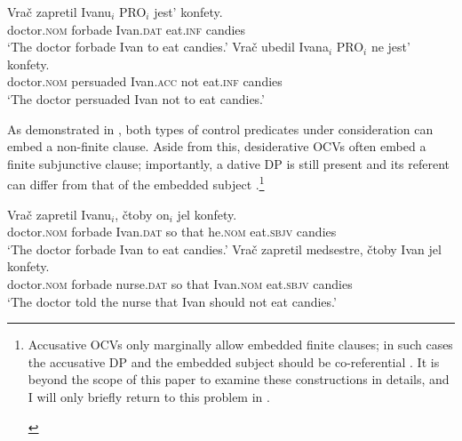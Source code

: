 \documentclass[output=paper,
colorlinks,
citecolor=brown,
newtxmath
]{langscibook}
\begin{document}
\begin{exe}
\ex\label{ex3} \begin{xlist}
\ex\label{ex3a} 
\gll Vrač zapretil Ivanu$_i$ PRO$_i$ jest’ konfety.\\ 
    doctor.\textsc{nom} forbade Ivan.\textsc{dat} {} eat.\textsc{inf} candies \\
\glt `The doctor forbade Ivan to eat candies.'
\ex\label{ex3b} 
\gll Vrač ubedil Ivana$_i$ PRO$_i$ ne jest’ konfety.\\ 
    doctor.\textsc{nom} persuaded Ivan.\textsc{acc} {} not eat.\textsc{inf} candies \\
\glt `The doctor persuaded Ivan not to eat candies.'
    \end{xlist}
\end{exe}

\noindent As demonstrated in , both types of control predicates under consideration can embed a non-finite clause. Aside from this, desiderative OCVs often embed a finite subjunctive clause; importantly, a dative DP is still present and its referent can differ from that of the embedded subject .\footnote{
Accusative OCVs only marginally allow embedded finite clauses; in such cases the accusative DP and the embedded subject should be co-referential . It is beyond the scope of this paper to examine these constructions in details, and I will only briefly return to this problem in . 

\begin{exe}
\ex\label{ex0} \begin{xlist}
    \end{xlist}
\end{exe}
}

\begin{exe}
\ex\label{ex4} \begin{xlist}
\ex\label{ex4a} 
\gll Vrač zapretil Ivanu$_i$, čtoby on$_i$ jel konfety.\\ 
    doctor.\textsc{nom} forbade Ivan.\textsc{dat} {so that} he.\textsc{nom} eat.\textsc{sbjv} candies \\
\glt `The doctor forbade Ivan to eat candies.'
\ex\label{ex4b} 
\gll Vrač zapretil medsestre, čtoby Ivan jel konfety.\\ 
    doctor.\textsc{nom} forbade nurse.\textsc{dat} {so that} Ivan.\textsc{nom} eat.\textsc{sbjv} candies \\
\glt `The doctor told the nurse that Ivan should not eat candies.'
    \end{xlist}
\end{exe}
\end{document}
